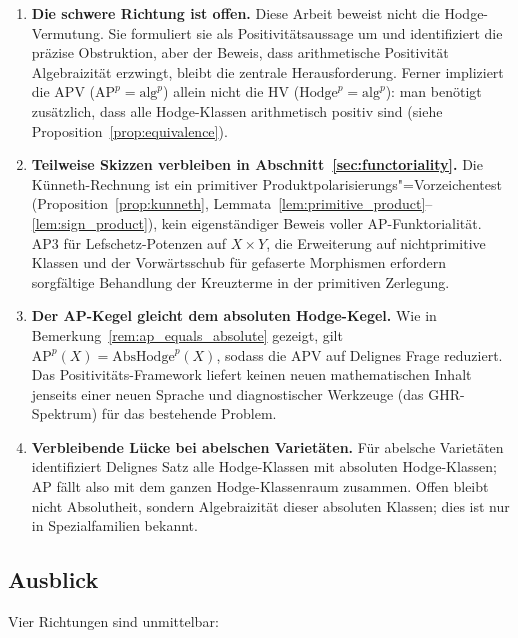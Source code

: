 \documentclass[aps,prd,twocolumn,superscriptaddress,nofootinbib]{revtex4-2}
\theoremstyle{definition}
\theoremstyle{remark}
\begin{document}
\begin{enumerate}
\item \textbf{Die schwere Richtung ist offen.} Diese Arbeit beweist nicht die Hodge-Vermutung. Sie formuliert sie als Positivitätsaussage um und identifiziert die präzise Obstruktion, aber der Beweis, dass arithmetische Positivität Algebraizität erzwingt, bleibt die zentrale Herausforderung. Ferner impliziert die APV ($\mathrm{AP}^p = \mathrm{alg}^p$) allein nicht die HV ($\mathrm{Hodge}^p = \mathrm{alg}^p$): man benötigt zusätzlich, dass alle Hodge-Klassen arithmetisch positiv sind (siehe Proposition~\ref{prop:equivalence}).

\item \textbf{Teilweise Skizzen verbleiben in Abschnitt~\ref{sec:functoriality}.} Die Künneth-Rechnung ist ein primitiver Produktpolarisierungs"=Vorzeichentest (Proposition~\ref{prop:kunneth}, Lemmata~\ref{lem:primitive_product}--\ref{lem:sign_product}), kein eigenständiger Beweis voller AP-Funktorialität. AP3 für Lefschetz-Potenzen auf $X\times Y$, die Erweiterung auf nichtprimitive Klassen und der Vorwärtsschub für gefaserte Morphismen erfordern sorgfältige Behandlung der Kreuzterme in der primitiven Zerlegung.

\item \textbf{Der AP-Kegel gleicht dem absoluten Hodge-Kegel.} Wie in Bemerkung~\ref{rem:ap_equals_absolute} gezeigt, gilt $\mathrm{AP}^p(X) = \mathrm{AbsHodge}^p(X)$, sodass die APV auf Delignes Frage reduziert. Das Positivitäts-Framework liefert keinen neuen mathematischen Inhalt jenseits einer neuen Sprache und diagnostischer Werkzeuge (das GHR-Spektrum) für das bestehende Problem.

\item \textbf{Verbleibende Lücke bei abelschen Varietäten.} Für abelsche Varietäten identifiziert Delignes Satz alle Hodge-Klassen mit absoluten Hodge-Klassen; AP fällt also mit dem ganzen Hodge-Klassenraum zusammen. Offen bleibt nicht Absolutheit, sondern Algebraizität dieser absoluten Klassen; dies ist nur in Spezialfamilien bekannt.
\end{enumerate}

\subsection{Ausblick}

Vier Richtungen sind unmittelbar:
\end{document}
